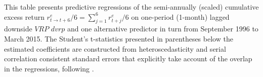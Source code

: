 \documentclass[11pt]{article}
\begin{document}
{\begin{sidewaystable}
\begin{center}
{\begin{tabular}{lcccccccccccc}
\end{tabular}
}
\end{center}
\noindent \tiny This table presents predictive regressions of the semi-annually (scaled) cumulative excess return $r^e_{t\rightarrow t+6}/6=\sum^6_{j=1}r^e_{t+j}/6$ on one-period (1-month) lagged downside $VRP$ $dvrp$ and one alternative predictor in turn from September 1996 to March 2015. The Student's t-statistics presented in parentheses below the estimated coefficients are constructed from heteroscedasticity and serial correlation consistent standard errors that explicitly take account of the overlap in the regressions, following \cite{Hodrick92RFS}.
\end{sidewaystable}
}



\newpage

{\normalsize
\begin{sidewaystable}
\caption{\small Semi-Annual Simple Predictive Regressions, September 1996 to December 2007}
\label{TabRobustnessReducedSemiAnnual2007}
\footnotesize
\begin{center}
\end{center}
\end{sidewaystable}}
\end{document}
